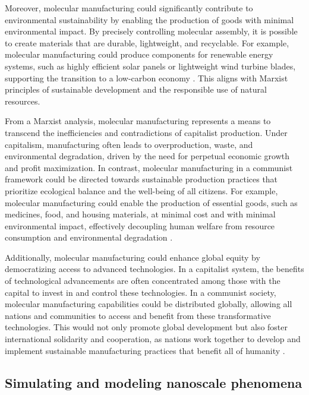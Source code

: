 Moreover, molecular manufacturing could significantly contribute to environmental sustainability by enabling the production of goods with minimal environmental impact. By precisely controlling molecular assembly, it is possible to create materials that are durable, lightweight, and recyclable. For example, molecular manufacturing could produce components for renewable energy systems, such as highly efficient solar panels or lightweight wind turbine blades, supporting the transition to a low-carbon economy \cite[pp.~310-315]{ratner2003nanotechnology}. This aligns with Marxist principles of sustainable development and the responsible use of natural resources.

From a Marxist analysis, molecular manufacturing represents a means to transcend the inefficiencies and contradictions of capitalist production. Under capitalism, manufacturing often leads to overproduction, waste, and environmental degradation, driven by the need for perpetual economic growth and profit maximization. In contrast, molecular manufacturing in a communist framework could be directed towards sustainable production practices that prioritize ecological balance and the well-being of all citizens. For example, molecular manufacturing could enable the production of essential goods, such as medicines, food, and housing materials, at minimal cost and with minimal environmental impact, effectively decoupling human welfare from resource consumption and environmental degradation \cite[pp.~78-85]{drexler1986engines}.

Additionally, molecular manufacturing could enhance global equity by democratizing access to advanced technologies. In a capitalist system, the benefits of technological advancements are often concentrated among those with the capital to invest in and control these technologies. In a communist society, molecular manufacturing capabilities could be distributed globally, allowing all nations and communities to access and benefit from these transformative technologies. This would not only promote global development but also foster international solidarity and cooperation, as nations work together to develop and implement sustainable manufacturing practices that benefit all of humanity \cite[pp.~150-160]{freitas1999nanomedicine}.

\subsection{Simulating and modeling nanoscale phenomena}

